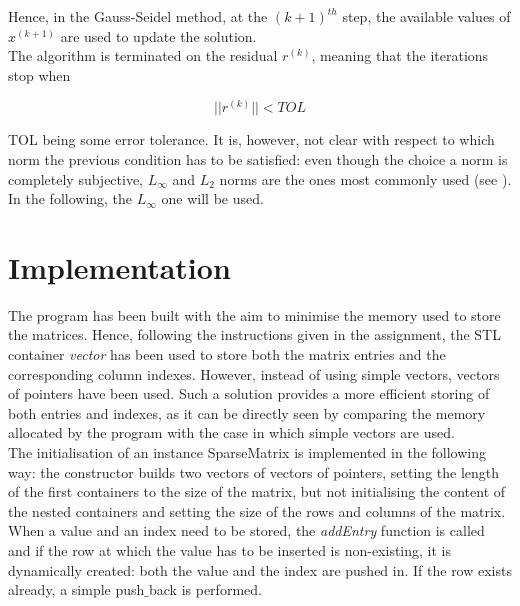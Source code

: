 \documentclass[11pt]{article}
\theoremstyle{theorem}
\theoremstyle{definition}
\begin{document}
Hence, in the Gauss-Seidel method, at the $(k+1)^{th}$ step, the available values of $x^{(k+1)}$ are used to update the solution.\\
The algorithm is terminated on the residual $r^{(k)}$, meaning that the iterations stop when

$$||r^{(k)}||<TOL$$

TOL being some error tolerance. It is, however, not clear with respect to which norm the previous condition has to be satisfied: even though the choice a norm is completely subjective, $L_\infty$ and $L_2$ norms are the ones most commonly used (see \cite{lec-notes}). In the following, the $L_\infty$ one will be used.\\

\section{Implementation}
The program has been built with the aim to minimise the memory used to store the matrices. Hence, following the instructions given in the assignment, the STL container \emph{vector} has been used to store both the matrix entries and the corresponding column indexes. However, instead of using simple vectors, vectors of pointers have been used. Such a solution provides a more efficient storing of both entries and indexes, as it can be directly seen by comparing the memory allocated by the program with the case in which simple vectors are used.\\
The initialisation of an instance SparseMatrix is implemented in the following way: the constructor builds two vectors of vectors of pointers, setting the length of the first containers to the size of the matrix, but not initialising the content of the nested containers and setting the size of the rows and columns of the matrix. When a value and an index need to be stored, the \emph{addEntry} function is called and if the row at which the value has to be inserted is non-existing, it is dynamically created: both the value and the index are pushed in. If the row exists already, a simple push$\_$back is performed.\\ 
\end{document}
